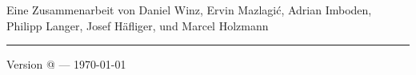 \documentclass[a5paper,10pt,fleqn]{book}
\makeatletter
\newcommand*{\rom}[1]{\expandafter\@slowromancap\romannumeral #1@}
\makeatother
\begin{document}
\vfill{}

\begin{large}
	\begin{center}
		\normalfont
		\noindent
		Eine Zusammenarbeit von
			Daniel Winz,
			Ervin Mazlagi\'c,
			Adrian Imboden,
			Philipp Langer,
			Josef Häfliger,
			und
			Marcel Holzmann
	\end{center}
\end{large}

\begin{large}	
	\noindent\rule{\textwidth}{2pt}
	\begin{center}
		\noindent
		Version \rom{4} --- \today
	\end{center}
\end{large}
\end{document}
